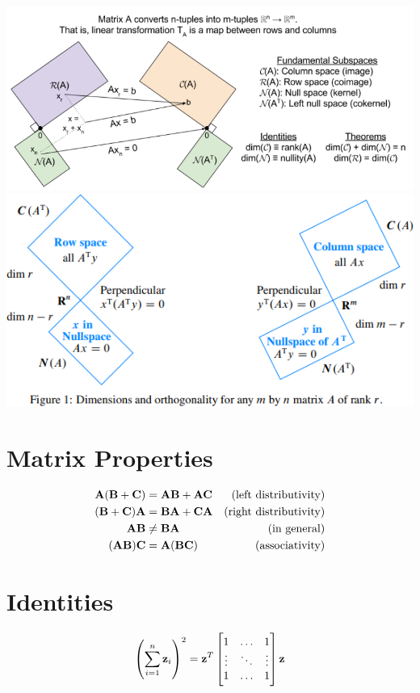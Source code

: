 \begin{center}
\includegraphics[width=\textwidth]{imgs/fund_theorem_lin_alg4.png}
\includegraphics[width=\textwidth]{imgs/fund_theorem_lin_alg5.png}
\end{center}


\section{Matrix Properties}

\begin{align}
\mathbf{A}(\mathbf{B}+\mathbf{C}) &=   \mathbf{A}\mathbf{B}+\mathbf{A}\mathbf{C} &\textrm{(left distributivity)}   \\
(\mathbf{B}+\mathbf{C})\mathbf{A} &=   \mathbf{B}\mathbf{A}+\mathbf{C}\mathbf{A} &\textrm{(right distributivity)}  \\
\mathbf{A}\mathbf{B}       &\ne \mathbf{B}\mathbf{A}        &\textrm{(in general)}            \\
(\mathbf{A}\mathbf{B})\mathbf{C}  &=   \mathbf{A}(\mathbf{B}\mathbf{C})   &\textrm{(associativity)}
\end{align}

\section{Identities}
\begin{align}
\left(\sum_{i=1}^n \mathbf{z}_i\right)^2 = \mathbf{z}^T
\begin{bmatrix}
1      & \hdots & 1      \\
\vdots & \ddots & \vdots \\
1      & \hdots & 1      
\end{bmatrix}
\mathbf{z}
\end{align}

